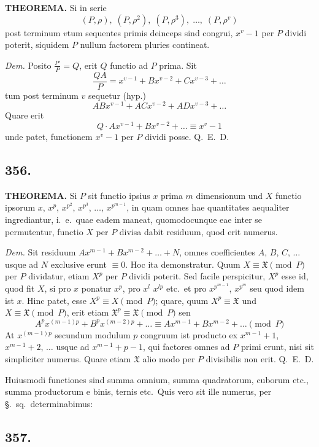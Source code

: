 \documentclass[12pt,a4paper]{article}
\newcommand{\Sec}{\S}
\begin{document}
\textbf{THEOREMA.} Si in serie
\[
(P,\rho),\; (P,\rho^2),\; (P,\rho^3),\; \ldots,\; (P,\rho^v)
\]
post terminum $v$tum sequentes primis deinceps sind congrui, $x^v-1$ per $P$ dividi poterit, siquidem $P$ nullum factorem pluries contineat.

\textit{Dem.} Posito $\frac{P'}{P}=Q$, erit $Q$ functio ad $P$ prima. Sit
\[
\frac{QA}{P}=x^{v-1}+Bx^{v-2}+Cx^{v-3}+\ldots
\]
tum post terminum $v$ sequetur (hyp.)
\[
ABx^{v-1}+ACx^{v-2}+ADx^{v-3}+\ldots
\]
Quare erit
\[
Q\cdot Ax^{v-1} + Bx^{v-2} + \ldots \equiv x^v-1
\]
unde patet, functionem $x^v-1$ per $P$ dividi posse. Q.~E.~D.

\subsection*{356.}

\textbf{THEOREMA.} Si $P$ sit functio ipsius $x$ prima $m$ dimensionum und $X$ functio ipsorum $x$, $x^p$, $x^{p^2}$, $x^{p^3}$, $\ldots$, $x^{p^{m-1}}$, in quam omnes hae quantitates aequaliter ingrediantur, i.~e.~quae eadem maneat, quomodocunque eae inter se permutentur, functio $X$ per $P$ divisa dabit residuum, quod erit numerus.

\textit{Dem.} Sit residuum $Ax^{m-1}+Bx^{m-2}+\ldots+N$, omnes coefficientes $A$, $B$, $C$, $\ldots$ usque ad $N$ exclusive erunt $\equiv 0$. Hoc ita demonstratur. Quum $X\equiv \mathfrak{X}\pmod{P}$ per $P$ dividatur, etiam $X^p$ per $P$ dividi poterit. Sed facile perspicitur, $X^p$ esse id, quod fit $X$, si pro $x$ ponatur $x^p$, pro $x^l$ $x^{lp}$ etc.~et pro $x^{p^{m-1}}$, $x^{p^m}$ seu quod idem ist $x$. Hinc patet, esse $X^p\equiv X\pmod{P}$; quare, quum $X^p\equiv \mathfrak{X}$ und $X\equiv \mathfrak{X}\pmod{P}$, erit etiam $\mathfrak{X}^p\equiv \mathfrak{X}\pmod{P}$ sen
\[
A^p x^{(m-1)p} + B^p x^{(m-2)p} + \ldots \equiv Ax^{m-1} + Bx^{m-2} + \ldots \pmod{P}
\]
At $x^{(m-1)p}$ secundum modulum $p$ congruum ist producto ex $x^{m-1}+1$, $x^{m-1}+2$, $\ldots$ usque ad $x^{m-1}+p-1$, qui factores omnes ad $P$ primi erunt, nisi sit simpliciter numerus. Quare etiam $\mathfrak{X}$ alio modo per $P$ divisibilis non erit. Q.~E.~D.

Huiusmodi functiones sind summa omnium, summa quadratorum, cuborum etc., summa productorum e binis, ternis etc.~Quis vero sit ille numerus, per \Sec.~sq.~determinabimus:

\subsection*{357.}
\end{document}
